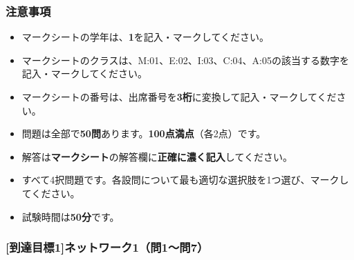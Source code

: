 \documentclass[b4paper,7pt,twocolumn,landscape]{jsarticle}
\begin{document}

\subsubsection*{注意事項}
{
\begin{itemize}
  \item マークシートの学年は、\textbf{1}を記入・マークしてください。
  \item マークシートのクラスは、M:01、E:02、I:03、C:04、A:05の該当する数字を記入・マークしてください。
  \item マークシートの番号は、出席番号を\textbf{3桁}に変換して記入・マークしてください。
  \item 問題は全部で\textbf{50問}あります。\textbf{100点満点}（各2点）です。
  \item 解答は\textbf{マークシート}の解答欄に\textbf{正確に濃く記入}してください。
  \item すべて4択問題です。各設問について最も適切な選択肢を1つ選び、マークしてください。
  \item 試験時間は\textbf{50分}です。
\end{itemize}
}

\subsubsection*{[到達目標1]ネットワーク1（問1〜問7）}
\end{document}
